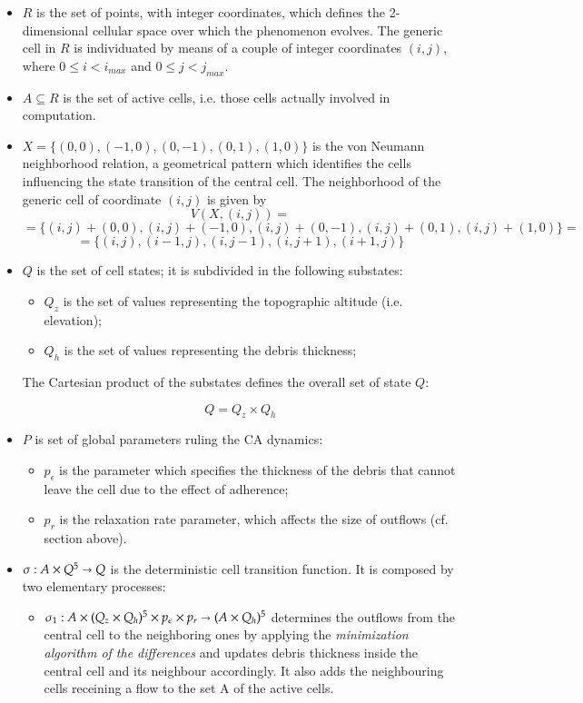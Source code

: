 \begin{itemize}

\item $R$ is the set of points, with integer coordinates, which
  defines the 2-dimensional cellular space over which the phenomenon
  evolves. The generic cell in $R$ is individuated by means of a
  couple of integer coordinates $(i, j)$, where $0 \leq i < i_{max}$
  and $0 \leq j < j_{max}$.

\item $A \subseteq R$ is the set of active cells, i.e. those cells
  actually involved in computation.

\item $X = \{(0,0), (-1, 0), (0, -1), (0, 1), (1, 0)\}$ is the von
  Neumann neighborhood relation, a geometrical pattern which
  identifies the cells influencing the state transition of the central
  cell. The neighborhood of the generic cell of coordinate $(i, j)$ is
  given by
$$V(X, (i, j)) =$$
$$= \{(i, j)+(0,0), (i, j)+(-1, 0), (i, j)+(0, -1),
(i, j)+(0, 1), (i, j)+(1, 0)\} =$$
$$= \{(i, j), (i-1, j), (i, j-1), (i, j+1), (i+1, j)\}$$

\item $Q$ is the set of cell states; it is subdivided in the following
  substates:

\begin{itemize}
    \item   $Q_z$ is the set of values representing the topographic altitude (i.e. elevation);
    \item   $Q_h$ is the set of values representing the debris thickness;
\end{itemize}

The Cartesian product of the substates defines the overall set of
state $Q$:

$$Q = Q_z \times Q_h$$

\item   $P$ is set of global parameters ruling the CA dynamics:

\begin{itemize}
    \item   $p_\epsilon$ is the parameter which specifies the thickness of the debris that cannot leave the cell due to the effect of adherence;
    \item   $p_r$ is the relaxation rate parameter, which affects the size of outflows (cf. section above).
\end{itemize}

\item $\sigma : A \times Q^5 \shortrightarrow Q$ is the deterministic cell
  transition function. It is composed by two elementary processes:
\begin{itemize}
\item $\sigma_1 : A \times (Q_z \times Q_h)^5 \times p_\epsilon \times
  p_r\shortrightarrow (A \times Q_h)^5$ determines the outflows from
  the central cell to the neighboring ones by applying the
  \emph{minimization algorithm of the differences} and updates debris
  thickness inside the central cell and its neighbour accordingly. It
  also adds the neighbouring cells receining a flow to the set A of the
  active cells.


\end{itemize}
\end{itemize}
